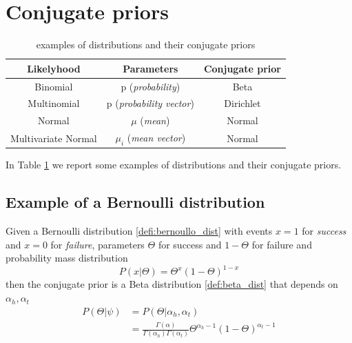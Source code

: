 \section{Conjugate priors}
    
    \begin{table}
        \centering
        \begin{tabular}{|c|c|c|}
            \hline
            \textbf{Likelyhood} & \textbf{Parameters} & \textbf{Conjugate prior}  \\
            \hline
            Binomial & p (\textit{probability}) & Beta  \\
            \hline
            Multinomial & p (\textit{probability vector}) & Dirichlet \\
            \hline
            Normal & $\mu$ (\textit{mean}) & Normal \\
            \hline
            Multivariate Normal & $\mu_i$ (\textit{mean vector}) & Normal \\
            \hline
        \end{tabular}
        \caption{examples of distributions and their conjugate priors}
        \label{table:conj_priors}
    \end{table}
    
    In Table \ref{table:conj_priors} we report some examples of distributions and their conjugate priors.\\

    \subsection{Example of a Bernoulli distribution}
        Given a Bernoulli distribution \ref{defi:bernoullo_dist} with events $x=1$ for \textit{success} and $x=0$ for \textit{failure}, parameters $\Theta$ for success and $1-\Theta$ for failure and probability mass distribution 
        $$P(x|\Theta) = \Theta^x(1-\Theta)^{1-x}$$
        then the conjugate prior is a Beta distribution \ref{def:beta_dist} that depends on $\alpha_h, \alpha_t$
        \begin{align*}
        P(\Theta|\psi)  &= P(\Theta|\alpha_h, \alpha_t)\\
                        &= \frac{\Gamma(\alpha)}{\Gamma(\alpha_h)\Gamma(\alpha_t)} \Theta^{\alpha_h -1} (1-\Theta)^{\alpha_t -1}
        \end{align*}
        
